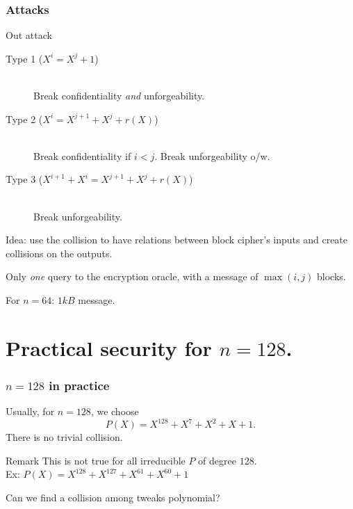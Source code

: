 \documentclass{beamer}
\begin{document}
	\begin{frame}
		\frametitle{Attacks}

		\begin{block}{Out attack}
		\begin{description}
			\item[Type 1 ($X^i = X^j + 1$)] \ \\
			Break confidentiality \emph{and} unforgeability.   
			\item[Type 2 ($X^i  = X^{j+1} + X^j + r(X)$)] \ \\ Break confidentiality if $i < j$. Break unforgeability o/w.   
			\item[Type 3 ($X^{i+1} + X^i  = X^{j+1} + X^j + r(X)$)]  \ \\
			Break unforgeability.   
		\end{description}
		\end{block}

		Idea: use the collision to have relations between block cipher's inputs and create collisions on the outputs.
		
		Only \emph{one} query to the encryption oracle, with a message of $\max(i,j)$ blocks.
		
		For $n = 64$: $1kB$ message. 
	\end{frame}



\section{Practical security for $n = 128$.} %
\label{sec:practical_security_for_n_128}


	\begin{frame}
		\frametitle{$n = 128$ in practice}

		Usually, for $n = 128$, we choose
		\[
			P(X) = X^{128}+X^{7}+X^{2}+X+1.
		\]
		There is no trivial collision. 
		\begin{block}{Remark}
			This is not true for all irreducible $P$ of degree $128$.\\
			Ex: $P(X)=X^{128}+X^{127}+X^{61}+X^{60}+1$
		\end{block}
		
		Can we find a collision among tweaks polynomial?
	\end{frame}
\end{document}
